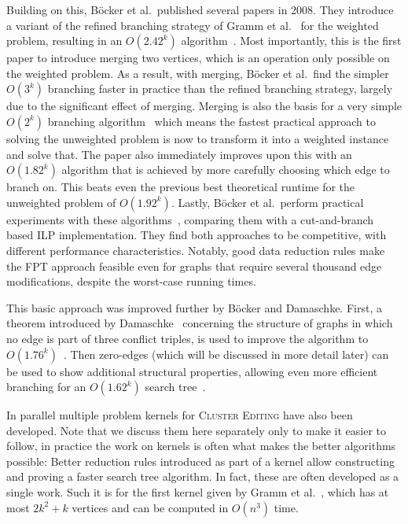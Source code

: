 \documentclass[12pt,oneside,english,parskip=full,headings=small]{scrbook}
\theoremstyle{definition}
\begin{document}
Building on this, Böcker et al.\ published several papers in 2008. They introduce a variant of the
refined branching strategy of Gramm et al.~\cite{Gramm} for the weighted problem, resulting in an
$O(2.42^k)$ algorithm~\cite{AnApproach}. Most importantly, this is the first paper to introduce
merging two vertices, which is an operation only possible on the weighted problem. As a result, with
merging, Böcker et al.\ find the simpler $O(3^k)$ branching faster in practice than the refined
branching strategy, largely due to the significant effect of merging. Merging is also the basis for
a very simple $O(2^k)$ branching algorithm~\cite{GoingWeighted} which means the fastest practical
approach to solving the unweighted problem is now to transform it into a weighted instance and solve
that.  The paper also immediately improves upon this with an $O(1.82^k)$ algorithm that is achieved
by more carefully choosing which edge to branch on. This beats even the previous best theoretical
runtime for the unweighted problem of $O(1.92^k)$. Lastly, Böcker et al.\ perform practical
experiments with these algorithms~\cite{ExactAlgos}, comparing them with a cut-and-branch based ILP
implementation.  They find both approaches to be competitive, with different performance
characteristics. Notably, good data reduction rules make the FPT approach feasible even for graphs
that require several thousand edge modifications, despite the worst-case running times.

This basic approach was improved further by Böcker and Damaschke. First, a theorem introduced by
Damaschke~\cite{BoundedDegree} concerning the structure of graphs in which no edge is part of three
conflict triples, is used to improve the algorithm to $O(1.76^k)$~\cite{EvenFaster}. Then zero-edges
(which will be discussed in more detail later) can be used to show additional structural properties,
allowing even more efficient branching for an $O(1.62^k)$ search tree~\cite{GoldenRatio}.

In parallel multiple problem kernels for \textsc{Cluster Editing} have also been developed. Note
that we discuss them here separately only to make it easier to follow, in practice the work on
kernels is often what makes the better algorithms possible: Better reduction rules introduced as
part of a kernel allow constructing and proving a faster search tree algorithm. In fact, these are
often developed as a single work. Such it is for the first kernel given by Gramm et al.~\cite{Gramm},
which has at most $2k^2 + k$ vertices and can be computed in $O(n^3)$ time.
\end{document}
